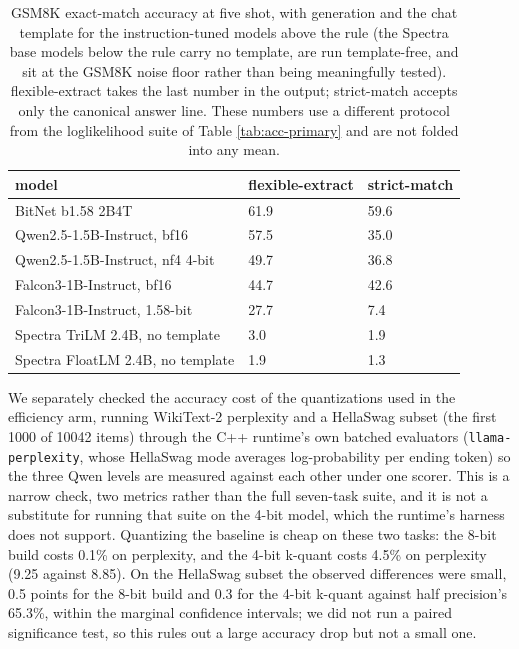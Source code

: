 \documentclass[11pt]{article}
\begin{document}
\begin{table}[htbp]\centering
\caption{GSM8K exact-match accuracy at five shot, with generation and the chat template for the instruction-tuned models above the rule (the Spectra base models below the rule carry no template, are run template-free, and sit at the GSM8K noise floor rather than being meaningfully tested). flexible-extract takes the last number in the output; strict-match accepts only the canonical answer line. These numbers use a different protocol from the loglikelihood suite of Table \ref{tab:acc-primary} and are not folded into any mean.}
\label{tab:gsm8k}
\footnotesize
\begin{tabularx}{\linewidth}{LLL}\toprule
model & flexible-extract & strict-match \\
\midrule
BitNet b1.58 2B4T & 61.9 & 59.6 \\
Qwen2.5-1.5B-Instruct, bf16 & 57.5 & 35.0 \\
Qwen2.5-1.5B-Instruct, nf4 4-bit & 49.7 & 36.8 \\
Falcon3-1B-Instruct, bf16 & 44.7 & 42.6 \\
Falcon3-1B-Instruct, 1.58-bit & 27.7 & 7.4 \\
\midrule
Spectra TriLM 2.4B, no template & 3.0 & 1.9 \\
Spectra FloatLM 2.4B, no template & 1.9 & 1.3 \\
\bottomrule\end{tabularx}\end{table}

We separately checked the accuracy cost of the quantizations used in the efficiency arm,
running WikiText-2 perplexity and a HellaSwag subset (the first 1000 of 10042 items)
through the C++ runtime's own batched evaluators (\texttt{llama-perplexity}, whose HellaSwag
mode averages log-probability per ending token) so the three Qwen levels are measured
against each other under one scorer. This is a narrow check, two metrics rather than the
full seven-task suite, and it is not a substitute for running that suite on the 4-bit
model, which the runtime's harness does not support. Quantizing the baseline is cheap on
these two tasks: the 8-bit build costs 0.1\% on perplexity, and the 4-bit k-quant costs
4.5\% on perplexity (9.25 against 8.85). On the HellaSwag subset the observed differences
were small, 0.5 points for the 8-bit build and 0.3 for the 4-bit k-quant against half
precision's 65.3\%, within the
marginal confidence intervals; we did not run a paired significance test, so this rules
out a large accuracy drop but not a small one.
\end{document}
